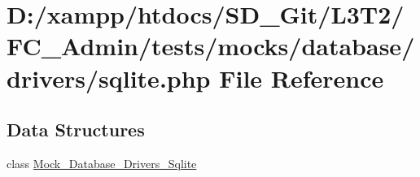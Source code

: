 \hypertarget{_admin_2tests_2mocks_2database_2drivers_2sqlite_8php}{}\section{D\+:/xampp/htdocs/\+S\+D\+\_\+\+Git/\+L3\+T2/\+F\+C\+\_\+\+Admin/tests/mocks/database/drivers/sqlite.php File Reference}
\label{_admin_2tests_2mocks_2database_2drivers_2sqlite_8php}
\subsection*{Data Structures}
\begin{DoxyCompactItemize}
\item 
class \hyperlink{class_mock___database___drivers___sqlite}{Mock\+\_\+\+Database\+\_\+\+Drivers\+\_\+\+Sqlite}
\end{DoxyCompactItemize}
